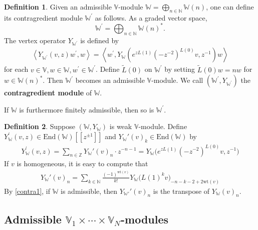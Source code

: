 \documentclass[11pt,b5paper,notitlepage]{article}
\theoremstyle{definition}
\newtheorem{df}{Definition}[section]
\theoremstyle{plain}
\newcommand{\wtd}{\widetilde}
\newcommand{\End}{\mathrm{End}} %
\newcommand{\Vbb}{\mathbb V}
\newcommand{\Wbb}{\mathbb W}
\newcommand{\Nbb}{\mathbb N}
\newcommand{\Zbb}{\mathbb Z}
\newcommand{\wt}{\mathrm{wt}}
\newcommand{\<}{\left\langle}
\renewcommand{\>}{\right\rangle}
\numberwithin{equation}{section}
\begin{document}
\begin{df}
    Given an admissible $\Vbb$-module $\Wbb=\bigoplus_{n\in \Nbb} \Wbb(n)$, one can define its contragredient module $\Wbb^\prime$ as follows. As a graded vector space,
    \begin{equation}\label{grading2}
    \Wbb^\prime=\bigoplus_{n\in \Nbb}\Wbb(n)^*.
    \end{equation}
    The vertex operator $Y_{\Wbb^\prime}$ is defined by 
    \begin{align}\label{contra1}
    \<Y_{\Wbb^\prime}(v,z)w^\prime,w\>=\<w^\prime ,Y_\Wbb(e^{zL(1)}(-z^{-2})^{L(0)}v,z^{-1})w\>
    \end{align}
    for each $v\in \Vbb,w\in \Wbb,w^\prime\in \Wbb^\prime$.    Define $\wtd{L}(0)$ on $\Wbb^{\prime}$ by setting $\wtd{L}(0)w=nw$ for $w\in \Wbb(n)^*$. Then $\Wbb^\prime$ becomes an admissible $\Vbb$-module. We call $(\Wbb^\prime,Y_{\Wbb^\prime})$ the \textbf{contragredient module} of $\Wbb$.
\end{df}
 
 If $\Wbb$ is furthermore finitely admissible, then so is $\Wbb^\prime$.

\begin{df}\label{lb59}
    Suppose $(\Wbb,Y_\Wbb)$ is weak $\Vbb$-module. Define $Y_\Wbb^\prime(v,z)\in\End(\Wbb)[[z^{\pm1}]]$ and $Y_\Wbb'(v)_k\in\End(\Wbb)$ by \index{Y@$Y_\Wbb^\prime(v,z),Y_\Wbb^\prime(v)_k$}
    \begin{gather}
        Y_\Wbb^\prime(v,z)=\sum_{n\in\Zbb}Y_\Wbb'(v)_n\cdot z^{-n-1}=Y_\Wbb\big(e^{zL(1)}(-z^{-2})^{L(0)}v,z^{-1}\big)  \label{eq138}
    \end{gather}
If $v$ is homogeneous, it is easy to compute that
\begin{align}
    Y_\Wbb'(v)_n =\sum_{k\in \Nbb} \frac{(-1)^{\wt(v)}}{k!}Y_\Wbb\big(L(1)^k v\big)_{-n-k-2+2\wt(v)}   \label{eq139}
\end{align}
By \eqref{contra1}, if $\Wbb$ is admissible, then $Y_{\Wbb'}'(v)_n$ is the transpose of $Y_\Wbb(v)_n$.
\end{df}



\subsection{Admissible $\Vbb_1\times \cdots \times \Vbb_N$-modules}
\end{document}
